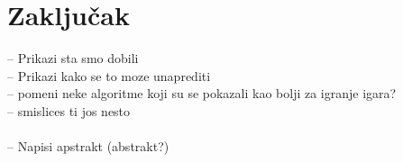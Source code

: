\chapter{Zaključak}
\label{ch:zakljucak}

-- Prikazi sta smo dobili \\
-- Prikazi kako se to moze unaprediti \\
-- pomeni neke algoritme koji su se pokazali kao bolji za igranje igara? \\
-- smislices ti jos nesto \\ ~\\

-- Napisi apstrakt (abstrakt?)